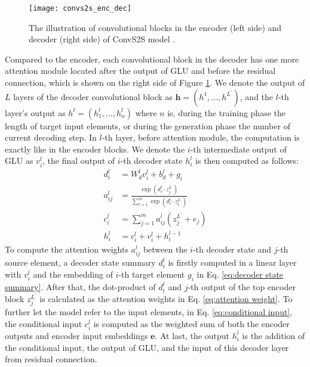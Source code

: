 \begin{figure}[h]
\texttt{[image: convs2s\_enc\_dec]}
\centering
\caption{The illustration of convolutional blocks in the encoder (left side) and decoder (right side) of ConvS2S model \cite{auliconvs2s}. }
\label{figure:convs2s enc dec}
\end{figure}

Compared to the encoder, each convolutional block in the decoder has one more attention module located after the output of GLU and before the residual connection, which is shown on the right side of Figure \ref{figure:convs2s enc dec}. We denote the output of $ L $ layers of the decoder convolutional block as $ \textbf{h} = (h^{1},...,h^{L^{'}}) $, and the $ l $-th layer's output as $ h^{l} = (h_{1}^{l},...,h_{n}^{l}) $ where $ n $ is, during the training phase the length of target input elements, or during the generation phase the number of current decoding step. In $ l $-th layer, before attention module, the computation is exactly like in the encoder blocks. We denote the $ i $-th intermediate output of GLU as $ v^{l}_{i} $, the final output of $ i $-th decoder state $ h_{i}^{l} $ is then computed as follows:
\begin{align}
d^{l}_{i} &= W^{l}_{d}v^{l}_{i} + b^{l}_{d} + g_{i} \label{eq:decoder state summary}\\
a^{l}_{ij} &= \frac{\exp(d^{l}_{i}\cdot z_{j}^{L^{'}})}{\sum_{t=1}^{m} \exp(d^{l}_{i}\cdot z_{t}^{L^{'}})} \label{eq:attention weight}\\
c^{l}_{i} &= \sum_{j=1}^{m} a^{l}_{ij}(z^{L^{'}}_{j}+e_{j}) \label{eq:conditional input}\\
h^{l}_{i} &= c^{l}_{i} + v^{l}_{i} + h^{l-1}_{i} \label{eq:decoder output}
\end{align}
To compute the attention weights $ a^{l}_{ij} $ between the $ i $-th decoder state and $ j $-th source element, a decoder state summary $ d^{l}_{i} $ is firstly computed in a linear layer with $ v^{l}_{i} $ and the embedding of $ i $-th target element $ g_{i} $ in Eq. \ref{eq:decoder state summary}. After that, the dot-product of $ d^{l}_{i} $ and $ j $-th output of the top encoder block $ z_{j}^{L^{'}} $ is calculated as the attention weights in Eq. \ref{eq:attention weight}. To further let the model refer to the input elements, in Eq. \ref{eq:conditional input}, the conditional input $ c_{i}^{l} $ is computed as the weighted sum of both the encoder outputs and encoder input embeddings $ \textbf{e} $. At last, the output $ h_{i}^{l} $ is the addition of the conditional input, the output of GLU, and the input of this decoder layer from residual connection. 

